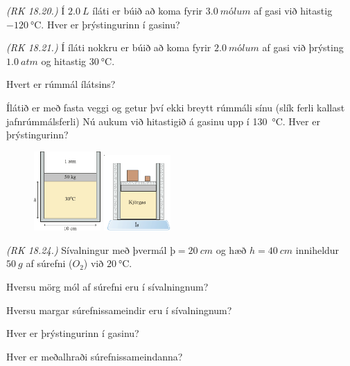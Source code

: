 \begin{enumerate}[label = \textbf{Dæmi \thechapter.\arabic*.}]

\setcounter{enumi}{7}

\item \textit{(RK 18.20.)} Í $\SI{2.0}{L}$ íláti er búið að koma fyrir $\SI{3.0}{mólum}$ af gasi við hitastig $\SI{-120}{\celsius}$. Hver er þrýstingurinn í gasinu?

\item \textit{(RK 18.21.)} Í íláti nokkru er búið að koma fyrir $\SI{2.0}{mólum}$ af gasi við þrýsting $\SI{1.0}{atm}$ og hitastig $\SI{30}{\celsius}$. \begin{enumerate*}[label = \textbf{(\alph*)}]
    \item Hvert er rúmmál ílátsins?
    \item Ílátið er með fasta veggi og getur því ekki breytt rúmmáli sínu (slík ferli kallast jafnrúmmálsferli) Nú aukum við hitastigið á gasinu upp í \SI{130}{\celsius}. Hver er þrýstingurinn?
\end{enumerate*}


\begin{minipage}{\linewidth}

\begin{figure}
\includegraphics[width = 1in]{figures/dia-bulla.pdf}
\includegraphics[width = 1in]{figures/kjorgas-bulla.pdf}
\end{figure}

\item \textit{(RK 18.24.)} Sívalningur með þvermál $þ = \SI{20}{cm}$ og hæð $h = \SI{40}{cm}$ inniheldur $\SI{50}{g}$ af súrefni ($O_2$) við $\SI{20}{\celsius}$. \begin{enumerate*}[label = \textbf{(\alph*)}]
    \item Hversu mörg mól af súrefni eru í sívalningnum?
    \item Hversu margar súrefnissameindir eru í sívalningnum?
    \item Hver er þrýstingurinn í gasinu?
    \item Hver er meðalhraði súrefnissameindanna?
\end{enumerate*}


\end{minipage}
\end{enumerate}
